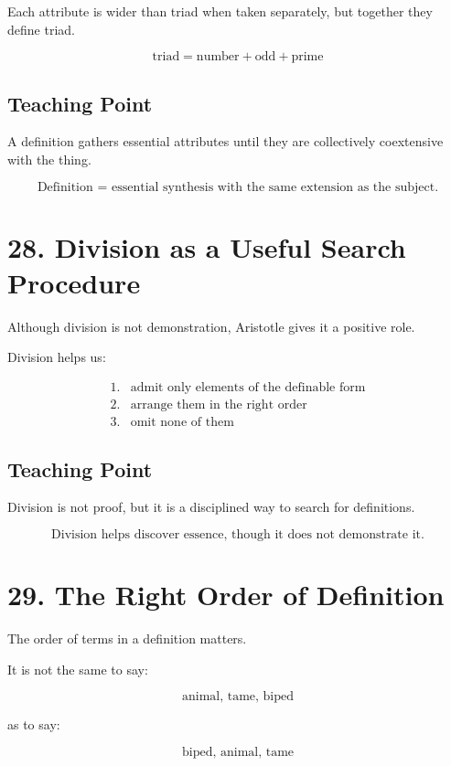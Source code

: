 \documentclass[12pt]{article}
\begin{document}
Each attribute is wider than triad when taken separately, but together they
define triad.

\[
\boxed{
\text{triad} = \text{number} + \text{odd} + \text{prime}
}
\]

\subsection*{Teaching Point}

A definition gathers essential attributes until they are collectively
coextensive with the thing.

\[
\boxed{
\text{Definition = essential synthesis with the same extension as the subject.}
}
\]

\section*{28. Division as a Useful Search Procedure}

Although division is not demonstration, Aristotle gives it a positive role.

Division helps us:

\[
\begin{array}{ll}
1. & \text{admit only elements of the definable form} \\
2. & \text{arrange them in the right order} \\
3. & \text{omit none of them}
\end{array}
\]

\subsection*{Teaching Point}

Division is not proof, but it is a disciplined way to search for definitions.

\[
\boxed{
\text{Division helps discover essence, though it does not demonstrate it.}
}
\]

\section*{29. The Right Order of Definition}

The order of terms in a definition matters.

It is not the same to say:

\[
\text{animal, tame, biped}
\]

as to say:

\[
\text{biped, animal, tame}
\]
\end{document}
